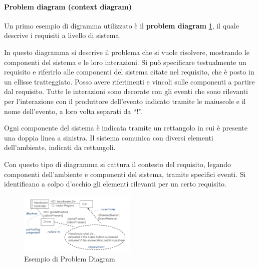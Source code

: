 \paragraph{Problem diagram (context diagram)}
Un primo esempio di digramma utilizzato è il \textbf{problem diagram}
\ref{fig:problemDiagram}, il quale descrive i requisiti a livello di sistema.

In questo diagramma si descrive il problema che si vuole risolvere, mostrando le
componenti del sistema e le loro interazioni. Si può specificare testualmente un
requisito e riferirlo alle componenti del sistema citate nel requisito, che è
posto in un ellisse tratteggiato. Posso avere riferimenti e vincoli sulle
componenti a partire dal requisito. Tutte le interazioni sono decorate con gli
eventi che sono rilevanti per l'interazione con il produttore dell'evento indicato
tramite le maiuscole e il nome dell'evento, a loro volta separati da “!”.

Ogni componente del sistema è indicata tramite un rettangolo in cui è presente
una doppia linea a sinistra. Il sistema comunica con diversi elementi
dell'ambiente, indicati da rettangoli.

Con questo tipo di diagramma si cattura il contesto del requisito, legando
componenti dell'ambiente e componenti del sistema, tramite specifici eventi.
Si identificano a colpo d'occhio gli elementi rilevanti per un certo requisito.
\begin{figure}[!ht]
      \centering
      \includegraphics[width = 0.5\textwidth]{img/requirements/PD.png}
      \caption{Esempio di Problem Diagram}
      \label{fig:problemDiagram}
\end{figure}

